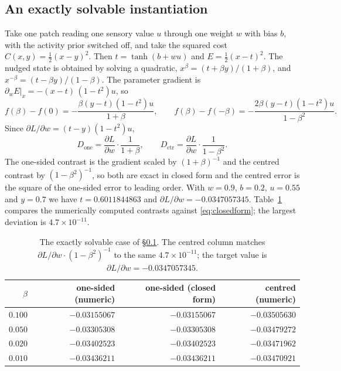 \documentclass[11pt]{article}
\theoremstyle{definition}
\theoremstyle{remark}
\begin{document}
\subsection{An exactly solvable instantiation}
\label{ex:chain}
Take one patch reading one sensory value $u$ through one weight $w$ with bias $b$, with the activity
prior switched off, and take the squared cost $C(x,y)=\tfrac12(x-y)^2$. Then
$t=\tanh(b+wu)$ and $E=\tfrac12(x-t)^2$. The nudged state is obtained by solving a quadratic,
$x^\beta=(t+\beta y)/(1+\beta)$, and $x^{-\beta}=(t-\beta y)/(1-\beta)$. The parameter gradient is
$\partial_wE\big|_x=-(x-t)\,(1-t^2)u$, so
\[
f(\beta)-f(0)=-\frac{\beta(y-t)(1-t^2)u}{1+\beta},
\qquad
f(\beta)-f(-\beta)=-\frac{2\beta(y-t)(1-t^2)u}{1-\beta^2}.
\]
Since $\partial L/\partial w=(t-y)(1-t^2)u$,
\begin{equation}
\boxed{\;D_{\text{one}}=\frac{\partial L}{\partial w}\cdot\frac{1}{1+\beta},
\qquad
D_{\text{ctr}}=\frac{\partial L}{\partial w}\cdot\frac{1}{1-\beta^{2}}.\;}
\label{eq:closedform}
\end{equation}
The one-sided contrast is the gradient scaled by $(1+\beta)^{-1}$ and the centred contrast by
$(1-\beta^2)^{-1}$, so both are exact in closed form and the centred error is the square of the
one-sided error to leading order. With $w=0.9$, $b=0.2$, $u=0.55$ and $y=0.7$ we have
$t=0.6011844863$ and $\partial L/\partial w=-0.0347057345$. Table~\ref{tab:closedform} compares the
numerically computed contrasts against \eqref{eq:closedform}; the largest deviation is
$4.7\times10^{-11}$.

\begin{table}[t]
\centering
\small
\begin{tabular}{rrrr}
\toprule
$\beta$ & one-sided (numeric) & one-sided (closed form) & centred (numeric)\\
\midrule
$0.100$ & $-0.03155067$ & $-0.03155067$ & $-0.03505630$\\
$0.050$ & $-0.03305308$ & $-0.03305308$ & $-0.03479272$\\
$0.020$ & $-0.03402523$ & $-0.03402523$ & $-0.03471962$\\
$0.010$ & $-0.03436211$ & $-0.03436211$ & $-0.03470921$\\
\bottomrule
\end{tabular}
\caption{The exactly solvable case of \S\ref{ex:chain}. The centred column matches
$\partial L/\partial w\cdot(1-\beta^2)^{-1}$ to the same $4.7\times10^{-11}$; the target value is
$\partial L/\partial w=-0.0347057345$.}
\label{tab:closedform}
\end{table}
\end{document}
